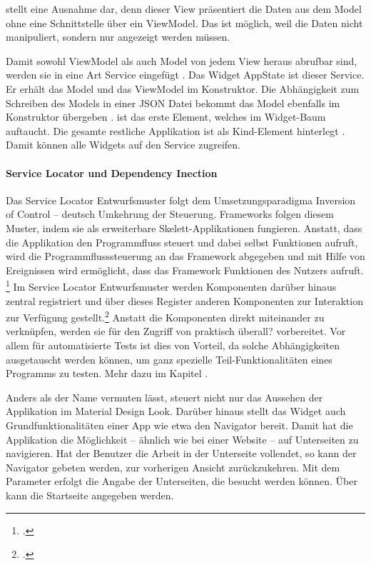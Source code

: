   stellt eine Ausnahme dar, denn dieser View präsentiert die Daten aus dem Model ohne eine Schnittstelle über ein ViewModel.
Das ist möglich, weil die Daten nicht manipuliert, sondern nur angezeigt werden müssen.

Damit sowohl ViewModel als auch Model von jedem View heraus abrufbar sind, werden sie in eine Art Service eingefügt .
Das Widget AppState ist dieser Service.
 Er erhält das Model  und das ViewModel   im Konstruktor.
Die Abhängigkeit zum Schreiben des Models in einer JSON Datei  bekommt das Model ebenfalls im Konstruktor übergeben .
 ist das erste Element, welches im Widget-Baum auftaucht.
Die gesamte restliche Applikation ist als Kind-Element hinterlegt .
Damit können alle Widgets auf den Service zugreifen.


\paragraph{Service Locator und Dependency Inection}

Das Service Locator Entwurfsmuster folgt dem Umsetzungsparadigma Inversion of Control – deutsch Umkehrung der Steuerung.
Frameworks folgen diesem Muster, indem sie als erweiterbare Skelett-Applikationen fungieren.
Anstatt, dass die Applikation den Programmfluss steuert und dabei selbst Funktionen aufruft, wird die Programmflusssteuerung an das Framework abgegeben und mit Hilfe von Ereignissen wird ermöglicht, dass das Framework Funktionen des Nutzers aufruft.
\footcite[Vgl.][]{johnson1988designing}
Im Service Locator Entwurfsmuster werden Komponenten darüber hinaus zentral registriert und über dieses Register anderen Komponenten zur Interaktion zur Verfügung gestellt.\footcite[Vgl.][]{fowler2004DependencyInjection}
Anstatt die Komponenten direkt miteinander zu verknüpfen, werden sie für den Zugriff von praktisch überall? vorbereitet.
Vor allem für automatisierte Tests ist dies von Vorteil, da solche Abhängigkeiten ausgetauscht werden können, um ganz spezielle Teil-Funktionalitäten eines Programms zu testen.
 Mehr dazu im Kapitel .


Anders als der Name vermuten lässt, steuert  nicht nur das Aussehen der Applikation im Material Design Look.
Darüber hinaus stellt das Widget auch Grundfunktionalitäten einer App wie etwa den Navigator bereit.
Damit hat die Applikation die Möglichkeit – ähnlich wie bei einer Website – auf Unterseiten zu navigieren.
Hat der Benutzer die Arbeit in der Unterseite vollendet, so kann der Navigator gebeten werden, zur vorherigen Ansicht zurückzukehren.
 Mit dem Parameter   erfolgt die Angabe der Unterseiten, die besucht werden können.
Über   kann die Startseite angegeben werden.

